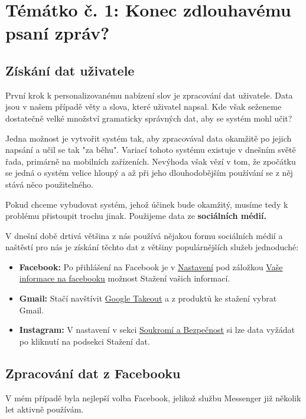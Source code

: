 \documentclass[a4paper, 12pt]{article}
\begin{document}
  \section{Témátko č. 1: Konec zdlouhavému psaní zpráv?}

  \subsection{Získání dat uživatele}
  První krok k personalizovanému nabízení slov je zpracování dat uživatele. Data jsou v našem případě věty a slova, které uživatel napsal. Kde však seženeme dostatečně velké množství gramaticky správných dat, aby se systém mohl učit?

  Jedna možnost je vytvořit systém tak, aby zpracovával data okamžitě po jejich napsání a učil se tak "za běhu". Variací tohoto systému existuje v dnešním světě řada, primárně na mobilních zařízeních. Nevýhoda však vězí v tom, že zpočátku se jedná o systém velice hloupý a až při jeho dlouhodobějším používání se z něj stává něco použitelného.

  Pokud chceme vybudovat systém, jehož účinek bude okamžitý, musíme tedy k problému přistoupit trochu jinak. Použijeme data ze \textbf{sociálních médií.}

  V dnešní době drtivá většina z nás používá nějakou formu sociálních médií a naštěstí pro nás je získání těchto dat z většiny populárnějších služeb jednoduché:
  \begin{itemize}
    \item \textbf{Facebook:} Po přihlášení na Facebook je v \href{https://www.facebook.com/settings?tab=your_facebook_information}{Nastavení} pod záložkou \href{https://www.facebook.com/settings?tab=your_facebook_information}{Vaše informace na facebooku} možnost Stažení vašich informací.
    \item \textbf{Gmail:} Stačí navštívit \href{https://takeout.google.com/}{Google Takeout} a z produktů ke stažení vybrat Gmail.
    \item \textbf{Instagram:} V nastavení v sekci \href{https://www.instagram.com/download/request/}{Soukromí a Bezpečnost} si lze data vyžádat po kliknutí na podsekci Stažení dat.
  \end{itemize}

  \subsection{Zpracování dat z Facebooku}
  V mém případě byla nejlepší volba Facebook, jelikož službu Messenger již několik let aktivně používám.
\end{document}
